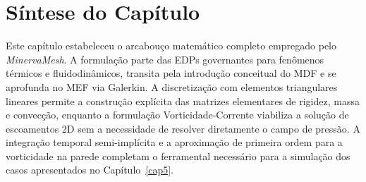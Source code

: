 \section{Síntese do Capítulo}
\label{sec:sintese_fundamentacao}

Este capítulo estabeleceu o arcabouço matemático completo empregado pelo \textit{MinervaMesh}. A formulação parte das EDPs governantes para fenômenos térmicos e fluidodinâmicos, transita pela introdução conceitual do MDF e se aprofunda no MEF via Galerkin. A discretização com elementos triangulares lineares permite a construção explícita das matrizes elementares de rigidez, massa e convecção, enquanto a formulação Vorticidade-Corrente viabiliza a solução de escoamentos 2D sem a necessidade de resolver diretamente o campo de pressão. A integração temporal semi-implícita e a aproximação de primeira ordem para a vorticidade na parede completam o ferramental necessário para a simulação dos casos apresentados no Capítulo~\ref{cap5}.
